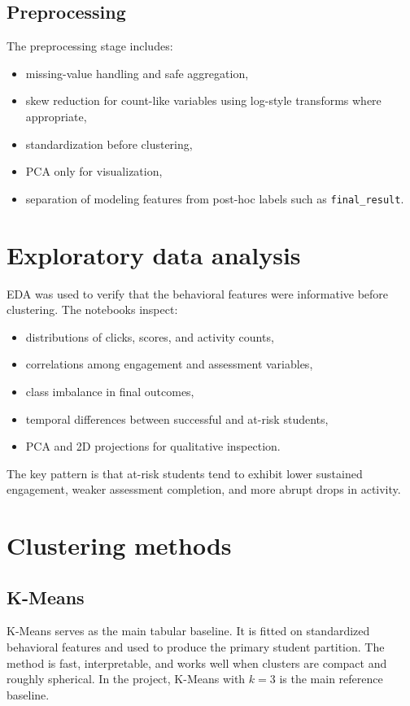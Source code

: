 \documentclass[11pt,a4paper]{article}
\begin{document}
\subsection{Preprocessing}
The preprocessing stage includes:
\begin{itemize}[leftmargin=*]
  \item missing-value handling and safe aggregation,
  \item skew reduction for count-like variables using log-style transforms where appropriate,
  \item standardization before clustering,
  \item PCA only for visualization,
  \item separation of modeling features from post-hoc labels such as \texttt{final\_result}.
\end{itemize}

\section{Exploratory data analysis}
EDA was used to verify that the behavioral features were informative before clustering. The notebooks inspect:
\begin{itemize}[leftmargin=*]
  \item distributions of clicks, scores, and activity counts,
  \item correlations among engagement and assessment variables,
  \item class imbalance in final outcomes,
  \item temporal differences between successful and at-risk students,
  \item PCA and 2D projections for qualitative inspection.
\end{itemize}
The key pattern is that at-risk students tend to exhibit lower sustained engagement, weaker assessment completion, and more abrupt drops in activity.

\section{Clustering methods}
\subsection{K-Means}
K-Means serves as the main tabular baseline. It is fitted on standardized behavioral features and used to produce the primary student partition. The method is fast, interpretable, and works well when clusters are compact and roughly spherical. In the project, K-Means with $k=3$ is the main reference baseline.
\end{document}
